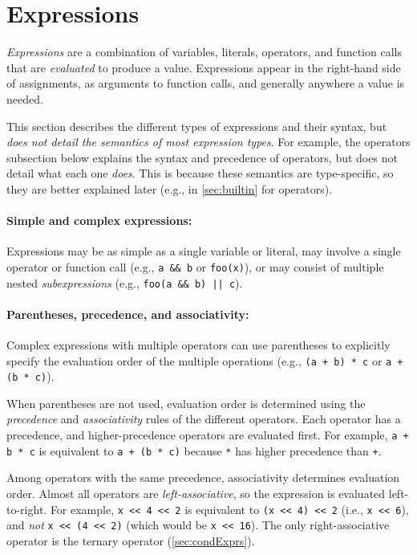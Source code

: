 \section{Expressions}
\label{sec:expressions}

\emph{Expressions} are a combination of variables, literals, operators, and function calls that are \emph{evaluated} to produce a value.
Expressions appear in the right-hand side of assignments, as arguments to function calls, and generally anywhere a value is needed.

This section describes the different types of expressions and their syntax, but \emph{does not detail the semantics of most expression types}.
For example, the operators subsection below explains the syntax and precedence of operators, but does not detail what each one \emph{does}.
This is because these semantics are type-specific, so they are better explained later (e.g., in \autoref{sec:builtin} for operators).

\paragraph{Simple and complex expressions:}
Expressions may be as simple as a single variable or literal, may involve a single operator or function call (e.g., \texttt{a \&\& b} or \texttt{foo(x)}),
or may consist of multiple nested \emph{subexpressions} (e.g., \texttt{foo(a \&\& b) || c}).

\paragraph{Parentheses, precedence, and associativity:}
Complex expressions with multiple operators can use parentheses to explicitly specify the evaluation order of the multiple operations
(e.g., \texttt{(a + b) * c} or \texttt{a + (b * c)}).

When parentheses are not used, evaluation order is determined using the \emph{precedence} and \emph{associativity} rules of the different operators.
Each operator has a precedence, and higher-precedence operators are evaluated first.
For example, \texttt{a + b * c} is equivalent to \texttt{a + (b * c)} because \texttt{*} has higher precedence than \texttt{+}.

Among operators with the same precedence, associativity determines evaluation order.
Almost all operators are \emph{left-associative}, so the expression is evaluated left-to-right.
For example, \verb|x << 4 << 2| is equivalent to \verb|(x << 4) << 2| (i.e., \verb|x << 6|),
and \emph{not} \verb|x << (4 << 2)| (which would be \verb|x << 16|).
The only right-associative operator is the ternary operator (\autoref{sec:condExprs}).

